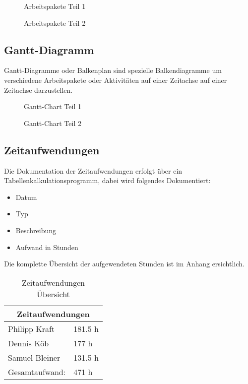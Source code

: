 \begin{figure}[H]
  \centering
  \caption{Arbeitspakete Teil 1}
\end{figure}

\begin{figure}[H]
  \centering
  \caption{Arbeitspakete Teil 2}
\end{figure}

\subsection{Gantt-Diagramm}
Gantt-Diagramme oder Balkenplan sind spezielle Balkendiagramme um verschiedene
Arbeitspakete oder Aktivitäten auf einer Zeitachse auf einer Zeitachse
darzustellen.

\clearpage \newpage
\begin{sidewaysfigure}[htbp]
  \centering
  \caption{Gantt-Chart Teil 1}
\end{sidewaysfigure}

\begin{sidewaysfigure}[htbp]
  \centering
  \caption{Gantt-Chart Teil 2}
\end{sidewaysfigure}
\clearpage

\subsection{Zeitaufwendungen}

Die Dokumentation der Zeitaufwendungen erfolgt über ein
Tabellenkalkulationsprogramm, dabei wird folgendes Dokumentiert:

\begin{itemize}
  \item Datum
  \item Typ
  \item Beschreibung
  \item Aufwand in Stunden
\end{itemize}

Die komplette Übersicht der aufgewendeten Stunden ist im Anhang ersichtlich.

\begin{table}[H]
  \centering
  \begin{tabular}{@{}ll@{}}
  \toprule
  \multicolumn{2}{c}{\textbf{Zeitaufwendungen}} \\ \midrule
  Philipp Kraft             & 181.5 h           \\
  Dennis Köb                & 177 h             \\
  Samuel Bleiner            & 131.5 h           \\ \midrule
  Gesamtaufwand:            & 471 h             \\ \bottomrule
  \end{tabular}
  \caption{Zeitaufwendungen Übersicht}
\end{table}